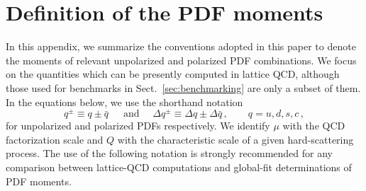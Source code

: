 \section{Definition of the PDF moments}
\label{app:notation}

In this appendix, we summarize the conventions adopted in this paper to denote 
the moments of relevant unpolarized and polarized PDF combinations.
%
We focus on the quantities which can be presently computed in lattice QCD,
although those used for benchmarks in Sect.~\ref{sec:benchmarking} are only
a subset of them.
%
In the equations below, we use the shorthand notation
\begin{equation}
q^\pm \equiv q\pm\bar{q}\, 
\quad\text{ and }\quad
\Delta q^\pm \equiv \Delta q\pm\Delta\bar{q}\, 
,\qquad q=u,d,s,c \,,
\end{equation}
%
for unpolarized and polarized PDFs respectively.
%
We identify $\mu$ with the QCD factorization scale and $Q$ with the 
characteristic scale of a given hard-scattering process.
%
The use of the following notation is strongly recommended for any comparison 
between lattice-QCD computations and global-fit determinations of 
PDF moments.

